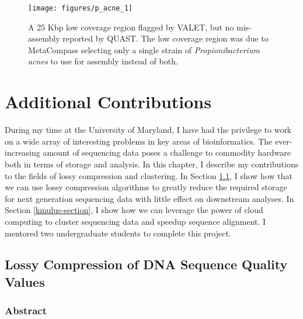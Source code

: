 \documentclass[12pt,\mydriver]{thesis}
\begin{document}
\begin{landscape}
\renewcommand{\baselinestretch}{1}
\small\normalsize
\begin{figure}[tb!]
\begin{center}
\texttt{[image: figures/p\_acne\_1]}
\end{center}
\renewcommand{\baselinestretch}{1}
\small\normalsize
\begin{quote}
\caption[Examining a 25 Kbp region flagged by VALET]{A 25 Kbp low coverage region flagged by VALET, but no mis-assembly reported by QUAST. The low coverage region was due to MetaCompass selecting only a single strain of \emph{Propionibacterium acnes} to use for assembly instead of both.}
\label{fig:p_acnes}
\end{quote}
\end{figure}
\renewcommand{\baselinestretch}{2}
\small\normalsize
\end{landscape}
\clearpage{}
\clearpage{}
\renewcommand{\thechapter}{6}

\chapter{Additional Contributions}

During my time at the University of Maryland, I have had the privilege to work on a wide array of interesting problems in key areas of bioinformatics.
The ever-increasing amount of sequencing data poses a challenge to commodity hardware both in terms of storage and analysis.
In this chapter, I describe my contributions to the fields of lossy compression and clustering.
In Section \ref{lossy-section}, I show how that we can use lossy compression algorithms to greatly reduce the required storage for next generation sequencing data with little effect on downstream analyses.
In Section \ref{kmulus-section}, I show how we can leverage the power of cloud computing to cluster sequencing data and speedup sequence alignment.
I mentored two undergraduate students to complete this project.

\section{Lossy Compression of DNA Sequence Quality Values}
\label{lossy-section}
\subsection{Abstract}
\end{document}
